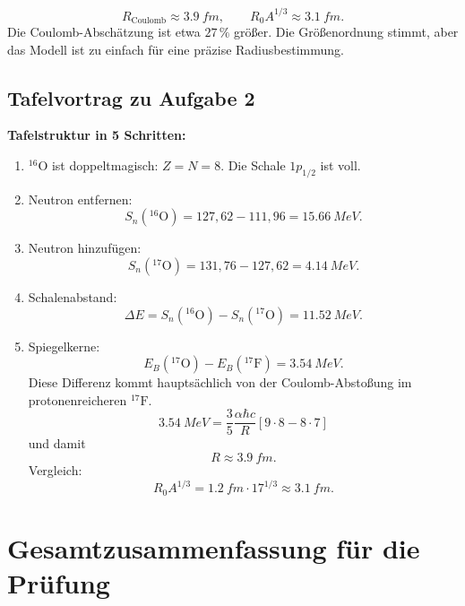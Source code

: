 \documentclass[11pt,a4paper]{scrartcl}
\newcommand{\bracket}[1]{\left[ #1 \right]}
\newcommand{\isotope}[2]{^{#1}\mathrm{#2}}
\theoremstyle{definition}
\theoremstyle{plain}
\theoremstyle{remark}
\begin{document}
\begin{enumerate}[label=(\alph*)]
    \begin{answerbox}
        \[
            \boxed{R_{\mathrm{Coulomb}}\approx\SI{3.9}{fm}},
            \qquad
            \boxed{R_0A^{1/3}\approx\SI{3.1}{fm}}.
        \]
        Die Coulomb-Absch\"atzung ist etwa $27\,\%$ gr\"o\ss{}er. Die Gr\"o\ss{}enordnung stimmt, aber das Modell ist zu einfach f\"ur eine pr\"azise Radiusbestimmung.
    \end{answerbox}
\end{enumerate}

\subsection{Tafelvortrag zu Aufgabe 2}

\begin{talkbox}
\textbf{Tafelstruktur in 5 Schritten:}
\begin{enumerate}
    \item $\isotope{16}{O}$ ist doppeltmagisch: $Z=N=8$. Die Schale $1p_{1/2}$ ist voll.
    \item Neutron entfernen:
    \[
        S_n(\isotope{16}{O})=127{,}62-111{,}96=\SI{15.66}{MeV}.
    \]
    \item Neutron hinzuf\"ugen:
    \[
        S_n(\isotope{17}{O})=131{,}76-127{,}62=\SI{4.14}{MeV}.
    \]
    \item Schalenabstand:
    \[
        \Delta E=S_n(\isotope{16}{O})-S_n(\isotope{17}{O})=\SI{11.52}{MeV}.
    \]
    \item Spiegelkerne:
    \[
        E_B(\isotope{17}{O})-E_B(\isotope{17}{F})=\SI{3.54}{MeV}.
    \]
    Diese Differenz kommt haupts\"achlich von der Coulomb-Absto\ss{}ung im protonenreicheren $\isotope{17}{F}$.
    \[
        \SI{3.54}{MeV}=\frac{3}{5}\frac{\alpha\hbar c}{R}\bracket{9\cdot 8-8\cdot 7}
    \]
    und damit
    \[
        R\approx\SI{3.9}{fm}.
    \]
    Vergleich:
    \[
        R_0A^{1/3}=\SI{1.2}{fm}\cdot 17^{1/3}\approx\SI{3.1}{fm}.
    \]
\end{enumerate}
\end{talkbox}

\FloatBarrier
\newpage

\section{Gesamtzusammenfassung f\"ur die Pr\"ufung}
\end{document}
